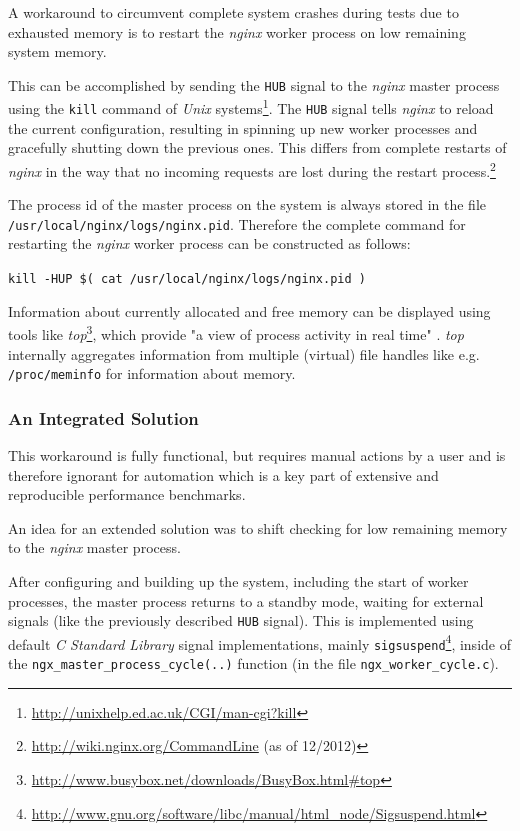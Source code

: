 A workaround to circumvent complete system crashes during tests due to exhausted memory is to restart the \textit{nginx} worker process on low remaining system memory.

This can be accomplished by sending the \texttt{HUB} signal to the \textit{nginx} master process using the \texttt{kill} command of \textit{Unix} systems\footnote{\url{http://unixhelp.ed.ac.uk/CGI/man-cgi?kill}}. The \texttt{HUB} signal tells \textit{nginx} to reload the current configuration, resulting in spinning up new worker processes and gracefully shutting down the previous ones. This differs from complete restarts of \textit{nginx} in the way that no incoming requests are lost during the restart process.\footnote{\url{http://wiki.nginx.org/CommandLine} (as of 12/2012)}

The process id of the master process on the system is always stored in the file \texttt{/usr/local/nginx/logs/nginx.pid}. Therefore the complete command for restarting the \textit{nginx} worker process can be constructed as follows:

\texttt{kill -HUP \$( cat /usr/local/nginx/logs/nginx.pid )}

Information about currently allocated and free memory can be displayed using tools like \textit{top}\footnote{\url{http://www.busybox.net/downloads/BusyBox.html\#top}}, which provide "a view of process activity in real time" \cite{busybox}. \textit{top} internally aggregates information from multiple (virtual) file handles like e.g. \texttt{/proc/meminfo} for information about memory.
\\

\subsubsection{An Integrated Solution}

This workaround is fully functional, but requires manual actions by a user and is therefore ignorant for automation which is a key part of extensive and reproducible performance benchmarks.

An idea for an extended solution was to shift checking for low remaining memory to the \textit{nginx} master process.

After configuring and building up the system, including the start of worker processes, the master process returns to a standby mode, waiting for external signals (like the previously described \texttt{HUB} signal). This is implemented using default \textit{C Standard Library} signal implementations, mainly \texttt{sigsuspend}\footnote{\url{http://www.gnu.org/software/libc/manual/html\_node/Sigsuspend.html}}, inside of the \texttt{ngx\_master\_process\_cycle(..)} function (in the file \texttt{ngx\_worker\_cycle.c}).

